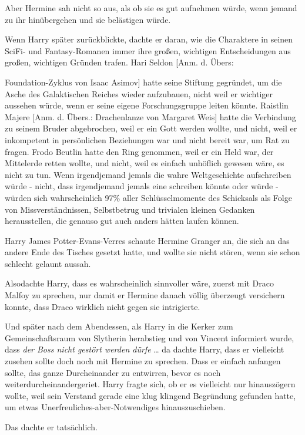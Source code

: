 {Aber Hermine sah nicht so aus, als ob sie es gut aufnehmen würde, wenn jemand zu ihr hinübergehen und sie belästigen würde.

Wenn Harry später zurückblickte, dachte er daran, wie die Charaktere in seinen SciFi- und Fantasy-Romanen immer ihre großen, wichtigen Entscheidungen aus großen, wichtigen Gründen trafen. Hari Seldon {[}Anm. d. Übers:

Foundation-Zyklus von Isaac Asimov{]} hatte seine Stiftung gegründet, um die Asche des Galaktischen Reiches wieder aufzubauen, nicht weil er wichtiger aussehen würde, wenn er seine eigene Forschungsgruppe leiten könnte. Raistlin Majere {[}Anm. d. Übers.: Drachenlanze von Margaret Weis{]} hatte die Verbindung zu seinem Bruder abgebrochen, weil er ein Gott werden wollte, und nicht, weil er inkompetent in persönlichen Beziehungen war und nicht bereit war, um Rat zu fragen. Frodo Beutlin hatte den Ring genommen, weil er ein Held war, der Mittelerde retten wollte, und nicht, weil es einfach unhöflich gewesen wäre, es nicht zu tun. Wenn irgendjemand jemals die wahre Weltgeschichte aufschreiben würde - nicht, dass irgendjemand jemals eine schreiben könnte oder würde - würden sich wahrscheinlich 97\% aller Schlüsselmomente des Schicksals als Folge von Missverständnissen, Selbstbetrug und trivialen kleinen Gedanken herausstellen, die genauso gut auch anders hätten laufen können.

Harry James Potter-Evans-Verres schaute Hermine Granger an, die sich an das andere Ende des Tisches gesetzt hatte, und wollte sie nicht stören, wenn sie schon schlecht gelaunt aussah.

Alsodachte Harry, dass es wahrscheinlich sinnvoller wäre, zuerst mit Draco Malfoy zu sprechen, nur damit er Hermine danach völlig überzeugt versichern konnte, dass Draco wirklich nicht gegen sie intrigierte.

Und später nach dem Abendessen, als Harry in die Kerker zum Gemeinschaftsraum von Slytherin herabstieg und von Vincent informiert wurde, dass \emph{der Boss nicht gestört werden dürfe} … da dachte Harry, dass er vielleicht zusehen sollte doch noch mit Hermine zu sprechen. Dass er einfach anfangen sollte, das ganze Durcheinander zu entwirren, bevor es noch weiterdurcheinandergeriet. Harry fragte sich, ob er es vielleicht nur hinauszögern wollte, weil sein Verstand gerade eine klug klingend Begründung gefunden hatte, um etwas Unerfreuliches-aber-Notwendiges hinauszuschieben.

Das dachte er tatsächlich.

}
